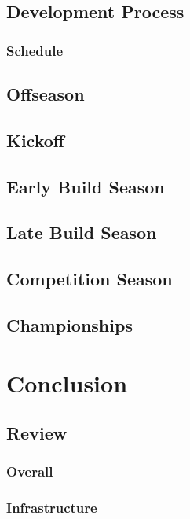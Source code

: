 \documentclass[11pt]{report}
\begin{document}
\section{Development Process}
\subsection{Schedule}

\section{Offseason}
\section{Kickoff}
\section{Early Build Season}
\section{Late Build Season}
\section{Competition Season}
\section{Championships}

\chapter{Conclusion}

\section{Review}
\subsection{Overall}
\subsection{Infrastructure}


\printbibliography[heading=bibintoc]
\end{document}

